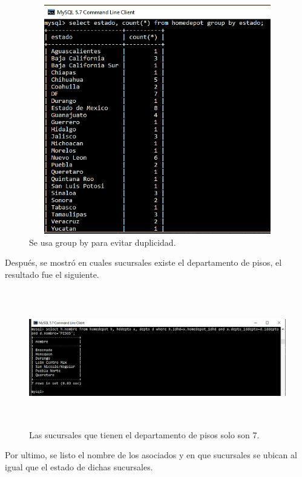 \documentclass[12pt, titlepage]{article}
\begin{document}
 \begin{figure}[H]
	\begin{center}
		\includegraphics[width=14cm, height=10cm]{img/comando11.png}
		\caption{Se usa group by para evitar duplicidad.}
		\label{fig:comando11}
	\end{center}
\end{figure}
Después, se mostró en cuales sucursales existe el departamento de pisos, el resultado fue el siguiente.
 \begin{figure}[H]
	\begin{center}
		\includegraphics[width=16cm, height=6cm]{img/comando12.png}
		\caption{Las sucursales que tienen el departamento de pisos solo son 7.}
		\label{fig:comando12}
	\end{center}
\end{figure}
Por ultimo, se listo el nombre de los asociados y en que sucursales se ubican al igual que el estado de dichas sucursales.
\end{document}
